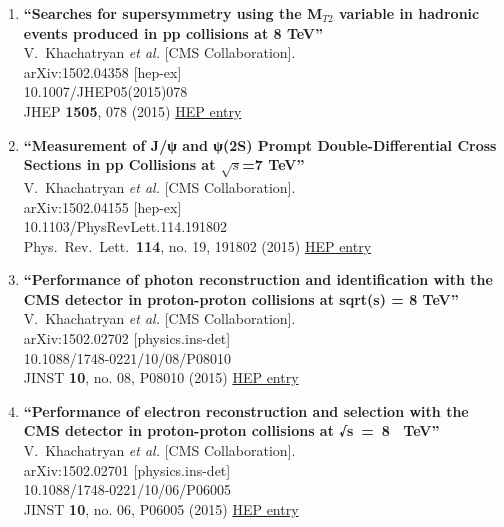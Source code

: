 \documentclass{article}
\begin{document}
\begin{enumerate}
\item%
{\bf ``Searches for supersymmetry using the M$_{T2}$ variable in hadronic events produced in pp collisions at 8 TeV''}
  \\{}V.~Khachatryan {\it et al.} [CMS Collaboration].
  \\{}arXiv:1502.04358 [hep-ex]
    \\{}10.1007/JHEP05(2015)078
\\{}JHEP {\bf 1505}, 078 (2015) %
\href{http://inspirehep.net/record/1345027}{HEP entry}


\item%
{\bf ``Measurement of J/ψ and ψ(2S) Prompt Double-Differential Cross Sections in pp Collisions at $\sqrt{s}$=7  TeV''}
  \\{}V.~Khachatryan {\it et al.} [CMS Collaboration].
  \\{}arXiv:1502.04155 [hep-ex]
    \\{}10.1103/PhysRevLett.114.191802
\\{}Phys.\ Rev.\ Lett.\  {\bf 114}, no. 19, 191802 (2015) %
\href{http://inspirehep.net/record/1345023}{HEP entry}


\item%
{\bf ``Performance of photon reconstruction and identification with the CMS detector in proton-proton collisions at sqrt(s) = 8 TeV''}
  \\{}V.~Khachatryan {\it et al.} [CMS Collaboration].
  \\{}arXiv:1502.02702 [physics.ins-det]
    \\{}10.1088/1748-0221/10/08/P08010
\\{}JINST {\bf 10}, no. 08, P08010 (2015) %
\href{http://inspirehep.net/record/1343792}{HEP entry}


\item%
{\bf ``Performance of electron reconstruction and selection with the CMS detector in proton-proton collisions at √s = 8  TeV''}
  \\{}V.~Khachatryan {\it et al.} [CMS Collaboration].
  \\{}arXiv:1502.02701 [physics.ins-det]
    \\{}10.1088/1748-0221/10/06/P06005
\\{}JINST {\bf 10}, no. 06, P06005 (2015) %
\href{http://inspirehep.net/record/1343791}{HEP entry}



\end{enumerate}
\end{document}
